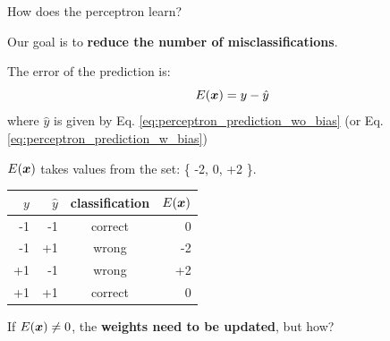 %
%
%

\begin{frame}[t]{How does the perceptron learn?}

    Our goal is to {\bf reduce the number of misclassifications}.\\
    \vspace{0.3cm}

    The error of the prediction is:
    \begin{equation}
        E(\boldsymbol{x}) = y - \hat{y}
        \label{eq:perceptron_prediction_error}
    \end{equation}        
    where $\hat{y}$ is given by Eq. \ref{eq:perceptron_prediction_wo_bias} 
    (or Eq. \ref{eq:perceptron_prediction_w_bias})\\
    \vspace{0.5cm}

    $E(\boldsymbol{x})$ takes values from the set: \{ -2, 0, +2 \}.\\
    \begin{center}
        \begin{tabular}{rrcr}
            \hline
            $y$  & $\hat{y}$ & classification & $E(\boldsymbol{x})$ \\
            \hline
            -1   & -1  &   correct &   0  \\
            -1   & +1  &   wrong   &  -2  \\
            +1   & -1  &   wrong   &  +2  \\
            +1   & +1  &   correct &   0  \\
            \hline
    \end{tabular}
    \end{center}

    If $E(\boldsymbol{x}) \ne 0$, the {\bf weights need to be updated}, but how?\\

\end{frame}

%
%
%

